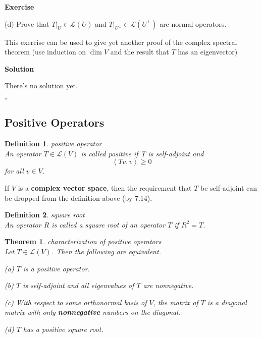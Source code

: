 \documentclass{article}
\newtheorem{theorem}{Theorem}[subsection]
\newtheorem{definition}{Definition}[subsection]
\newenvironment{exercise}{%
{\textbf{Exercise\\}
    }
}{
}
\newenvironment{solution}{%
{
    \textbf{Solution\\}
    }
}{
  \hfill $\square$ 
  \par\bigskip 
}
\begin{document}
\begin{CJK}{UTF8}{gkai}
\begin{exercise}
    (d) Prove that $T|_U \in \mathcal{L}(U)$ and $T|_{U^\bot} \in  \mathcal{L}(U^\bot)$ are normal operators.

    This exercise can be used to give yet another proof of the complex spectral theorem (use induction on $\dim V$ and the result that $T$ has an eigenvector)
\end{exercise}

\begin{solution}
There's no solution yet.

\end{solution}

\subsection{Positive Operators}

\begin{definition}
    positive operator\\

    An operator $T \in \mathcal{L}(V)$ is called positive if T is self-adjoint and
    \[\left<Tv,v\right> \geq 0\]
    for all $v \in V$.
\end{definition}

If $V$ is a \textbf{complex vector space}, then the requirement that $T$ be self-adjoint can be dropped from the definition above (by 7.14).

\begin{definition}
    square root\\

    An operator $R$ is called a square root of an operator $T$ if $R^2 = T$.
\end{definition}

\begin{theorem}
    characterization of positive operators\\

    Let $T \in \mathcal{L}(V)$. Then the following are equivalent.

    (a) $T$ is a positive operator.

    (b) $T$ is self-adjoint and all eigenvalues of $T$ are nonnegative.
 
    (c) With respect to some orthonormal basis of $V$, the matrix of $T$ is a diagonal matrix with only \textbf{nonnegative} numbers on the diagonal.
 
    (d) $T$ has a positive square root.


\end{theorem}
\end{CJK}
\end{document}
